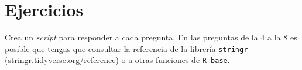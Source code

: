 \documentclass[
]{book}
\newenvironment{Shaded}{\begin{snugshade}}{\end{snugshade}}
\newcommand{\DataTypeTok}[1]{\textcolor[rgb]{0.13,0.29,0.53}{#1}}
\newcommand{\DecValTok}[1]{\textcolor[rgb]{0.00,0.00,0.81}{#1}}
\newcommand{\KeywordTok}[1]{\textcolor[rgb]{0.13,0.29,0.53}{\textbf{#1}}}
\newcommand{\NormalTok}[1]{#1}
\newcommand{\OperatorTok}[1]{\textcolor[rgb]{0.81,0.36,0.00}{\textbf{#1}}}
\newcommand{\StringTok}[1]{\textcolor[rgb]{0.31,0.60,0.02}{#1}}
\begin{document}
\begin{Shaded}
\end{Shaded}

\hypertarget{ejercicios}{%
\section{Ejercicios}\label{ejercicios}}

Crea un \emph{script} para responder a cada pregunta. En las preguntas de la 4 a la 8 es posible que tengas que consultar la referencia de la librería \href{https://stringr.tidyverse.org/reference/index.html}{\texttt{stringr} (stringr.tidyverse.org/reference)} o a otras funciones de \texttt{R\ base}.
\end{document}
